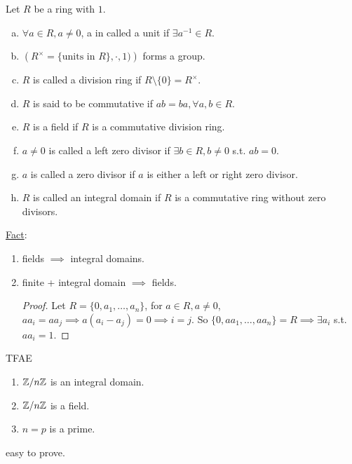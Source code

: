 \begin{definition}
  Let $R$ be a ring with $1$.
  \begin{enumerate}[(a)]
    \item $\forall a \in R, a \ne 0$, a in called a unit if
      $\exists a^{-1} \in R$.
  \item $\left(R^\times = \{\text{units in $R$}\}, \cdot, 1)\right)$ forms
    a group.
  \item $R$ is called a division ring if $R \setminus \{0\} = R^\times$.
  \item $R$ is said to be commutative if $ab = ba, \forall a, b \in R$.
  \item $R$ is a field if $R$ is a commutative division ring.
  \item $a \ne 0$ is called a left zero divisor if $\exists b \in R, b \ne 0$
    s.t. $ab = 0$.
  \item $a$ is called a zero divisor if $a$ is either a left or right zero
    divisor.
  \item $R$ is called an integral domain if $R$ is a commutative ring without
    zero divisors.
  \end{enumerate}
\end{definition}

\underline{Fact}:
\begin{enumerate}
  \item fields $\implies$ integral domains.
  \item finite + integral domain $\implies$ fields.
    \begin{proof}
      Let $R = \{ 0, a_1, \dots, a_n \}$, for $a \in R, a \ne 0$,
      $aa_i = aa_j \implies a(a_i - a_j) = 0 \implies i = j$.
      So $\{0, aa_1, \dots, aa_n \} = R \implies \exists a_i$ s.t. $aa_i = 1$.
    \end{proof}
\end{enumerate}

\begin{prop}
  TFAE
  \begin{enumerate}
    \item ${\mathbb{Z}}/{n\mathbb{Z}}$ is an integral domain.
    \item ${\mathbb{Z}}/{n\mathbb{Z}}$ is a field.
    \item $n = p$ is a prime.
  \end{enumerate}
  easy to prove.
\end{prop}

